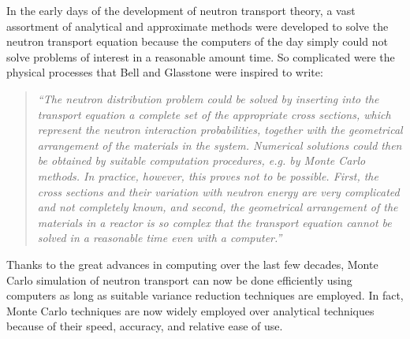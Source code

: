 In the early days of the development of neutron transport theory, a
vast assortment of analytical and approximate methods were developed
to solve the neutron transport equation because the computers of the
day simply could not solve problems of interest in a reasonable amount
time. So complicated were the physical processes that Bell and
Glasstone \cite{bell} were inspired to write:
\begin{quote}
{\it ``The neutron distribution problem could be solved by inserting
  into the transport equation a complete set of the appropriate cross
  sections, which represent the neutron interaction probabilities,
  together with the geometrical arrangement of the materials in the
  system. Numerical solutions could then be obtained by suitable
  computation procedures, e.g. by Monte Carlo methods. In practice,
  however, this proves not to be possible. First, the cross sections
  and their variation with neutron energy are very complicated and not
  completely known, and second, the geometrical arrangement of the
  materials in a reactor is so complex that the transport equation
  cannot be solved in a reasonable time even with a computer.''}
\end{quote}
Thanks to the great advances in computing over the last few decades,
Monte Carlo simulation of neutron transport can now be done
efficiently using computers as long as suitable variance reduction
techniques are employed. In fact, Monte Carlo techniques are now
widely employed over analytical techniques because of their speed,
accuracy, and relative ease of use.

